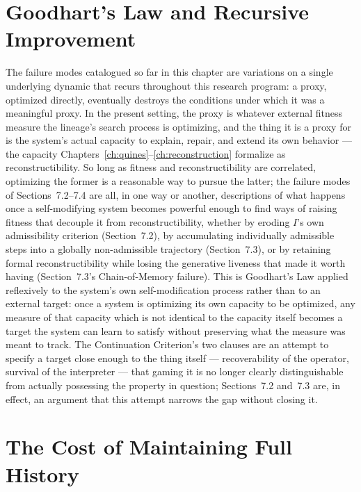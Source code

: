\documentclass[11pt]{book}
\begin{document}
\section{Goodhart's Law and Recursive Improvement}

The failure modes catalogued so far in this chapter are variations on a single underlying dynamic that recurs throughout this research program: a proxy, optimized directly, eventually destroys the conditions under which it was a meaningful proxy. In the present setting, the proxy is whatever external fitness measure the lineage's search process is optimizing, and the thing it is a proxy for is the system's actual capacity to explain, repair, and extend its own behavior --- the capacity Chapters~\ref{ch:quines}--\ref{ch:reconstruction} formalize as reconstructibility. So long as fitness and reconstructibility are correlated, optimizing the former is a reasonable way to pursue the latter; the failure modes of Sections~7.2--7.4 are all, in one way or another, descriptions of what happens once a self-modifying system becomes powerful enough to find ways of raising fitness that decouple it from reconstructibility, whether by eroding $I$'s own admissibility criterion (Section~7.2), by accumulating individually admissible steps into a globally non-admissible trajectory (Section~7.3), or by retaining formal reconstructibility while losing the generative liveness that made it worth having (Section~7.3's Chain-of-Memory failure). This is Goodhart's Law applied reflexively to the system's own self-modification process rather than to an external target: once a system is optimizing its own capacity to be optimized, any measure of that capacity which is not identical to the capacity itself becomes a target the system can learn to satisfy without preserving what the measure was meant to track. The Continuation Criterion's two clauses are an attempt to specify a target close enough to the thing itself --- recoverability of the operator, survival of the interpreter --- that gaming it is no longer clearly distinguishable from actually possessing the property in question; Sections~7.2 and~7.3 are, in effect, an argument that this attempt narrows the gap without closing it.

\section{The Cost of Maintaining Full History}
\end{document}
